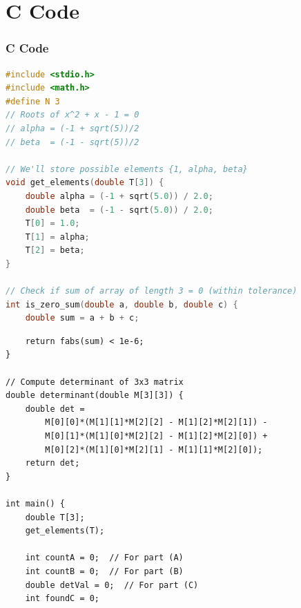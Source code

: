 \documentclass{beamer}
\theoremstyle{remark}
\numberwithin{equation}{section}
\numberwithin{equation}{section}
\begin{document}
\section{C Code}
\begin{frame}[fragile]
\frametitle{C Code }
\begin{lstlisting}[language=C]
#include <stdio.h>
#include <math.h>
#define N 3
// Roots of x^2 + x - 1 = 0
// alpha = (-1 + sqrt(5))/2
// beta  = (-1 - sqrt(5))/2

// We'll store possible elements {1, alpha, beta}
void get_elements(double T[3]) {
    double alpha = (-1 + sqrt(5.0)) / 2.0;
    double beta  = (-1 - sqrt(5.0)) / 2.0;
    T[0] = 1.0;
    T[1] = alpha;
    T[2] = beta;
}

// Check if sum of array of length 3 = 0 (within tolerance)
int is_zero_sum(double a, double b, double c) {
    double sum = a + b + c;
    \end{lstlisting}
    \end{frame}
    \begin{frame}[fragile]
    \begin{lstlisting}
    return fabs(sum) < 1e-6;
}

// Compute determinant of 3x3 matrix
double determinant(double M[3][3]) {
    double det = 
        M[0][0]*(M[1][1]*M[2][2] - M[1][2]*M[2][1]) -
        M[0][1]*(M[1][0]*M[2][2] - M[1][2]*M[2][0]) +
        M[0][2]*(M[1][0]*M[2][1] - M[1][1]*M[2][0]);
    return det;
}

int main() {
    double T[3];
    get_elements(T);

    int countA = 0;  // For part (A)
    int countB = 0;  // For part (B)
    double detVal = 0;  // For part (C)
    int foundC = 0;
\end{lstlisting}
\end{frame}
\end{document}
